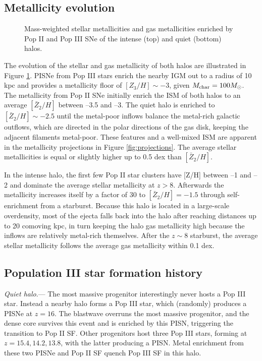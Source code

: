 \documentclass[apjl]{emulateapj}
\begin{document}
\subsection{Metallicity evolution}

\label{sec:Zevo}
\begin{figure}
  \caption{\label{fig:Zevo} Mass-weighted stellar metallicities and
    gas metallicities enriched by Pop II and Pop III SNe of the
    intense (top) and quiet (bottom) halos.}
\end{figure}

The evolution of the stellar and gas metallicity of both halos are
illustrated in Figure \ref{fig:Zevo}.  PISNe from Pop III stars enrich
the nearby IGM out to a radius of 10 kpc and provides a metallicity
floor of $[Z_3/H] \sim -3$, given $M_{\rm char} = 100 \Ms$.  The
metallicity from Pop II SNe initially enrich the ISM of both halos to
an average $[\bar{Z}_2/H]$ between --3.5 and --3.  The quiet halo is
enriched to $[\bar{Z}_2/H] \sim -2.5$ until the metal-poor inflows
balance the metal-rich galactic outflows, which are directed in the
polar directions of the gas disk, keeping the adjacent filaments
metal-poor.  These features and a well-mixed ISM
\citep[cf.][]{Wise08_Gal, Greif10} are apparent in the metallicity
projections in Figure \ref{fig:projections}.  The average stellar
metallicities is equal or slightly higher up to 0.5 dex than
$[\bar{Z}_2/H]$.

In the intense halo, the first few Pop II star clusters have [Z/H]
between --1 and --2 and dominate the average stellar metallicity at $z
> 8$.  Afterwards the metallicity increases itself by a factor of 30
to $[\bar{Z}_2/H] = -1.5$ through self-enrichment from a starburst.
Because this halo is located in a large-scale overdensity, most of the
ejecta falls back into the halo after reaching distances up to 20
comoving kpc, in turn keeping the halo gas metallicity high because
the inflows are relatively metal-rich themselves.  After the $z \sim
8$ starburst, the average stellar metallicity follows the average gas
metallicity within 0.1 dex.

\subsection{Population III star formation history}

\textit{Quiet halo}.--- The most massive progenitor interestingly
never hosts a Pop III star.  Instead a nearby halo forms a Pop III
star, which (randomly) produces a PISNe at $z=16$.  The blastwave
overruns the most massive progenitor, and the dense core survives this
event and is enriched by this PISN, triggering the transition to Pop
II SF.  Other progenitors host three Pop III stars, forming at $z =
15.4, 14.2, 13.8$, with the latter producing a PISN.  Metal enrichment
from these two PISNe and Pop II SF quench Pop III SF in this halo.
\end{document}
